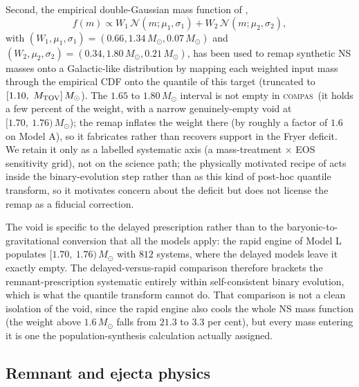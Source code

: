 \documentclass[twocolumn,apj]{openjournal}
\newcommand{\Msun}{M_\odot}
\newcommand{\Mtov}{M_{\rm TOV}}
\newcommand{\compas}{\textsc{compas}}
\begin{document}
Second, the empirical double-Gaussian mass function of \citet{alsing2018},
\begin{equation}
f(m) \propto W_1\,\mathcal{N}(m; \mu_1, \sigma_1) + W_2\,\mathcal{N}(m; \mu_2, \sigma_2),
\label{eq:nsremap}
\end{equation}
with $(W_1, \mu_1, \sigma_1) = (0.66, 1.34\,\Msun, 0.07\,\Msun)$ and
$(W_2, \mu_2, \sigma_2) = (0.34, 1.80\,\Msun, 0.21\,\Msun)$, has been used to remap
synthetic NS masses onto a Galactic-like distribution by mapping each weighted input
mass through the empirical CDF onto the quantile of this target (truncated to
$[1.10,\ \Mtov]\,\Msun$). The $1.65$ to $1.80\,\Msun$ interval is not empty in
\compas\ (it holds a few percent of the weight, with a narrow genuinely-empty void at
$[1.70,\ 1.76)\,\Msun$); the remap inflates the weight there (by roughly a factor of
$1.6$ on Model A), so it fabricates rather than recovers support in the Fryer deficit.
We retain it only as a labelled systematic axis
(a mass-treatment $\times$ EOS sensitivity grid), not on the science path; the physically
motivated recipe of \citet{mandel2020} acts inside the binary-evolution step rather
than as this kind of post-hoc quantile transform, so it motivates concern about the
deficit but does not license the remap as a fiducial correction.

The void is specific to the delayed prescription rather than to the
baryonic-to-gravitational conversion that all the models apply: the rapid engine of
Model L populates $[1.70,\ 1.76)\,\Msun$ with $812$ systems, where the delayed models
leave it exactly empty. The delayed-versus-rapid comparison therefore brackets the
remnant-prescription systematic entirely within self-consistent binary evolution, which
is what the quantile transform cannot do. That comparison is not a clean isolation of
the void, since the rapid engine also cools the whole NS mass function (the weight above
$1.6\,\Msun$ falls from $21.3$ to $3.3$ per cent), but every mass entering it is one the
population-synthesis calculation actually assigned.

\subsection{Remnant and ejecta physics} \label{sec:remnant}
\end{document}
